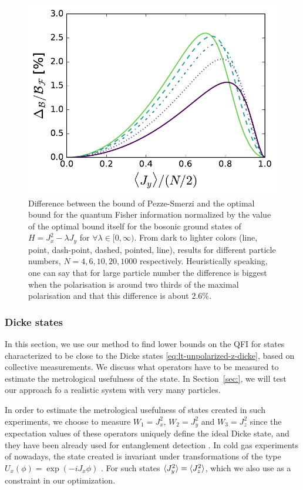 \begin{figure}
  \centering
  \includegraphics[scale=.65]{img/plots/LT_edge_diff.pdf}
  \caption{Difference between the bound of Pezze-Smerzi and the optimal bound for the quantum Fisher information normalized by the value of the optimal bound itself for the bosonic ground states of $H=J_x^2-\lambda J_y$ for $\forall \lambda \in [0,\infty)$.
  From dark to lighter colors (line, point, dash-point, dashed, pointed, line), results for different particle numbers, $N=4,6,10,20,1000$ respectively.
  Heuristically speaking, one can say that for large particle number the difference is biggest when the polarisation is around two thirds of the maximal polarisation and that this difference is about $2.6\%$.}
  \label{fig:lt-edge-diff}
\end{figure}

\subsubsection{Dicke states}
In this section, we use our method to find lower bounds on the QFI for states characterized to be close to the Dicke states \eqref{eq:lt-unpolarized-z-dicke}, based on collective measurements.
We discuss what operators have to be measured to estimate the metrological usefulness of the state.
In Section~\ref{sec:}, we will test our approach fo a realistic system with very many particles.

In order to estimate the metrological usefulness of states created in such experiments, we choose to measure $W_1=J_x^2$, $W_2=J_y^2$ and $W_3=J_z^2$ since the expectation values of these operators uniquely define the ideal Dicke state, and they have been already used for entanglement detection \citep{Lucke2014}.
In cold gas experiments of nowadays, the state created is invariant under transformations of the type $U_{x}(\phi)=\exp(-i J_x \phi)$ \citep{Apellaniz2015}.
For such states $\langle J_y^2 \rangle=\langle J_z^2 \rangle$, which we also use as a constraint in our optimization.

